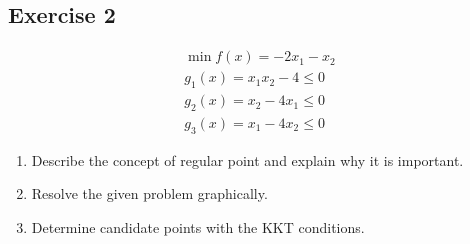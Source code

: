 \documentclass[\main/main.tex]{subfiles}
\begin{document}
\subsection{Exercise 2}

\begin{align*}
  \min f(x) = -2x_1 -x_2     \\
  g_1(x) = x_1x_2 - 4 \leq 0 \\
  g_2(x) = x_2 - 4x_1 \leq 0 \\
  g_3(x) = x_1 - 4x_2 \leq 0
\end{align*}

\begin{enumerate}
  \item Describe the concept of regular point and explain why it is important.
  \item Resolve the given problem graphically.
  \item Determine candidate points with the KKT conditions.
\end{enumerate}
\end{document}
